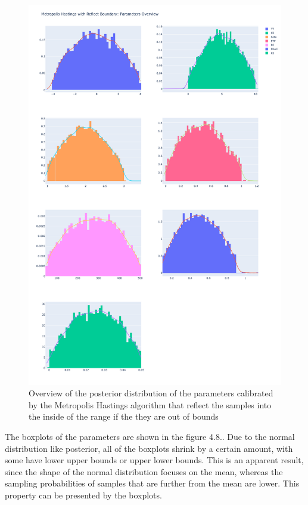 \begin{figure}
    \centering
    \includegraphics[width=1\textwidth]{figures/basic_mh/rb_mh/rb_mh_parameters_overview.png}
    \captionsetup{width=.8\textwidth}
    \caption{Overview of the posterior distribution of the parameters calibrated by the Metropolis Hastings algorithm that reflect the samples into the inside of the range if the they are out of bounds}
    \label{fig:enter-label}
\end{figure}

The boxplots of the parameters are shown in the figure 4.8.. Due to the normal distribution like posterior, all of the boxplots shrink by a certain amount, with some have lower upper bounds or upper lower bounds. This is an apparent result, since the shape of the normal distribution focuses on the mean, whereas the sampling probabilities of samples that are further from the mean are lower. This property can be presented by the boxplots.

